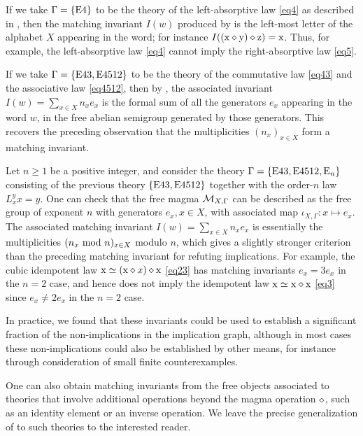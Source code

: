 \begin{example}  If we take $\Gamma = \{\mathrm{E}4\}$ to be the theory of the left-absorptive law \eqref{eq4} as described in , then the matching invariant $I(w)$ produced by  is the left-most letter of the alphabet $X$ appearing in the word; for instance $I((\mathrm{x} \diamond \mathrm{y}) \diamond \mathrm{z}) = \mathrm{x}$.  Thus, for example, the left-absorptive law \eqref{eq4} cannot imply the right-absorptive law \eqref{eq5}.
\end{example}

\begin{example}  If we take $\Gamma = \{\mathrm{E}43, \mathrm{E}4512\}$ to be the theory of the commutative law \eqref{eq43} and the associative law \eqref{eq4512}, then by , the associated invariant $I(w) = \sum_{x \in X} n_x e_x$ is the formal sum of all the generators $e_x$ appearing in the word $w$, in the free abelian semigroup generated by those generators.  This recovers the preceding observation that the multiplicities $(n_x)_{x \in X}$ form a matching invariant.
\end{example}

\begin{example}  Let $n \geq 1$ be a positive integer, and consider the theory $\Gamma = \{\mathrm{E}43, \mathrm{E}4512, \mathrm{E}_n\}$ consisting of the previous theory $\{\mathrm{E}43, \mathrm{E}4512\}$ together with the order-$n$ law $L_x^y x = y$.  One can check that the free magma ${\mathcal{M}}_{X,\Gamma}$ can be described as the free group of exponent $n$ with generators $e_x, x \in X$, with associated map $\iota_{X,\Gamma} \colon x \mapsto e_x$.  The associated matching invariant $I(w) = \sum_{x \in X} n_x e_x$ is essentially the multiplicities $(n_x \hbox{ mod } n)_{x \in X}$ modulo $n$, which gives a slightly stronger criterion than the preceding matching invariant for refuting implications.  For example, the cubic idempotent law $\mathrm{x} \simeq (\mathrm{x} \diamond x) \diamond \mathrm{x}$ \eqref{eq23}
has matching invariants $e_x = 3e_x$ in the $n=2$ case, and hence does not imply the idempotent law $\mathrm{x} \simeq \mathrm{x} \diamond \mathrm{x}$ \eqref{eq3} since $e_x \neq 2e_x$ in the $n=2$ case.
\end{example}

In practice, we found that these invariants could be used to establish a significant fraction of the non-implications in the implication graph, although in most cases these non-implications could also be established by other means, for instance through consideration of small finite counterexamples.

\begin{remark}  One can also obtain matching invariants from the free objects associated to theories that involve additional operations beyond the magma operation $\diamond$, such as an identity element or an inverse operation.  We leave the precise generalization of  to such theories to the interested reader.
\end{remark}

